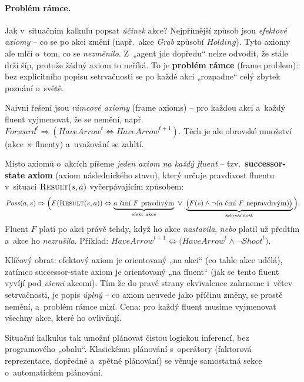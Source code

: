 \paragraph{Problém rámce.} Jak v~situačním kalkulu popsat \emph{účinek} akce? Nejpřímější způsob jsou \emph{efektové axiomy} -- co se po akci změní (např.\ akce \emph{Grab} způsobí $\mathit{Holding}$). Tyto axiomy ale mlčí o~tom, co se \emph{nezměnilo}. Z~„agent jde dopředu`` nelze odvodit, že stále drží šíp, protože žádný axiom to neříká. To je \textbf{problém rámce} (frame problem): bez explicitního popisu setrvačnosti se po každé akci „rozpadne`` celý zbytek poznání o~světě.

Naivní řešení jsou \emph{rámcové axiomy} (frame axioms) -- pro každou akci a~každý fluent vyjmenovat, že se nemění, např.\ $\mathit{Forward}^t \Rightarrow (\mathit{HaveArrow}^t \Leftrightarrow \mathit{HaveArrow}^{t+1})$. Těch je ale obrovské množství (akce $\times$ fluenty) a~uvažování se zahltí.

\begin{definice}
Místo axiomů o~akcích píšeme \emph{jeden axiom na každý fluent} -- tzv.\ \textbf{successor-state axiom} (axiom následnického stavu), který určuje pravdivost fluentu v~situaci $\textsc{Result}(s,a)$ vyčerpávajícím způsobem:
\[
  \mathit{Poss}(a,s) \Rightarrow \Big(F(\textsc{Result}(s,a)) \Leftrightarrow
  \underbrace{a\ \text{činí}\ F\ \text{pravdivým}}_{\text{efekt akce}}
  \ \vee\
  \underbrace{\big(F(s)\wedge \neg(a\ \text{činí}\ F\ \text{nepravdivým})\big)}_{\text{setrvačnost}}\Big).
\]
Fluent $F$ platí po akci právě tehdy, když ho akce \emph{nastavila}, \emph{nebo} platil už předtím a~akce ho \emph{nezrušila}. Příklad: $\mathit{HaveArrow}^{t+1} \Leftrightarrow \big(\mathit{HaveArrow}^t \wedge \neg \mathit{Shoot}^t\big)$.
\end{definice}

\begin{intuice}
Klíčový obrat: efektový axiom je orientovaný „na akci`` (co tahle akce udělá), zatímco successor-state axiom je orientovaný „na fluent`` (jak se tento fluent vyvíjí pod \emph{všemi} akcemi). Tím že do pravé strany ekvivalence zahrneme i~větev setrvačnosti, je popis \emph{úplný} -- co axiom neuvede jako příčinu změny, se prostě nemění, a~problém rámce mizí. Cena: pro každý fluent musíme vyjmenovat všechny akce, které ho ovlivňují.
\end{intuice}

Situační kalkulus tak umožní plánovat čistou logickou inferencí, bez programového „obalu``. Klasickému plánování s~operátory (faktorová reprezentace, dopředné a~zpětné plánování) se věnuje samostatná sekce o~automatickém plánování.

